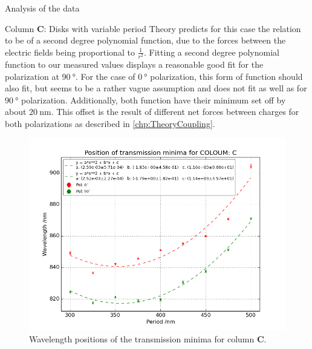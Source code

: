 \documentclass[pdftex, a4paper,11pt, twoside, UKenglish]{report}
\begin{document}
\begin{chapter}{Analysis of the data}
\begin{section}{Column \textbf{C}: Disks with variable period}
      Theory predicts for this case the relation to be of a second degree 
      polynomial function, due to the forces between the electric fields being
      proportional to $\frac{1}{r^{2}}$.
      Fitting a second degree polynomial function to our measured values
      displays a reasonable good fit for the polarization at $\SI{90}{\degree}$.
      For the case of $\SI{0}{\degree}$ polarization, this form of function
      should also fit, but seems to be a rather vague assumption and does not
      fit as well as for $\SI{90}{\degree}$ polarization.
      Additionally, both function have their minimum set off by about
      $\SI{20}{\nano\meter}$. This offset is the result of different net forces
      between charges for both polarizations as described in
      \cref{chp:TheoryCoupling}.
      
      \begin{figure}[b!]
        \centering
        \includegraphics[width=\textwidth]{Figures/MinimaPosC.png}
        \caption{Wavelength positions of the transmission minima for column
            \textbf{C}.}
        \label{fig:MinimaPosC}
      \end{figure}
      \newpage
      \begin{figure}[ht!]
        \centering
        \begin{minipage}{.95\textwidth}
          \centering

\end{minipage}
\end{figure}
\end{section}
\end{chapter}
\end{document}

